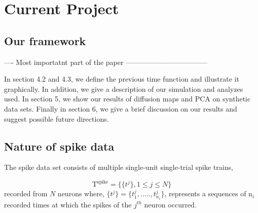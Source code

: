 
\section{Current Project}

\subsection{Our framework}

---- Most importatnt part of the paper -----------------------------------



In section  4.2 and 4.3,  we define the previous time function and illustrate it graphically.  In addition, we give a description of our simulation and analyzes used. In section 5, we show our results of diffusion maps and PCA on synthetic data sets.
Finally in section 6, we give a brief discussion on our results and suggest possible future directions.


\subsection{Nature of spike  data}
The  spike  data  set consists  of multiple single-unit single-trial spike trains,

\[ 
\text{T}^{\text{spike}} = \displaystyle \{ \{ t^{j} \} ,  1 \leq j \leq N \}  
\]
recorded from $N$  neurons  where,
$\displaystyle  \{t^{j}\} =  \{t_{1}^{j}, ....., t_{n_{i}}^{j} \} $, represents  a sequences of n$_{i}$ recorded times at which the spikes of the $j^{th}$ neuron occurred. 

 


